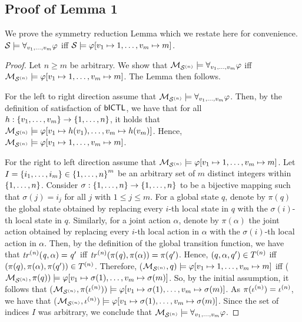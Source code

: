 \documentclass{article}
\newenvironment{customlemma}[1]
  {\renewcommand\theinnercustomlemma{#1}\innercustomlemma}
  {\endinnercustomlemma}
\begin{document}
\subsection{Proof of Lemma 1} 
We prove the symmetry reduction Lemma which we restate here for convenience.
\begin{customlemma}{1}
$\mathcal S \models \forall_{v_1,\ldots,v_m} \varphi$ iff $\mathcal S \models \varphi[v_1 \mapsto 1, \ldots, v_m
\mapsto m]$.
\end{customlemma}
\begin{proof}
Let  $n \geq m$ be arbitrary. We show that $\mathcal{M}_{\mathcal{S}^{(n)}}
\models \forall_{v_1,\ldots,v_m} \varphi$ iff $\mathcal{M}_{\mathcal{S}^{(n)}} \models \varphi[v_1 \mapsto 1, \ldots, v_m
\mapsto m]$. The Lemma then follows.

For the left to right direction assume that $\mathcal{M}_{\mathcal{S}^{(n)}} \models \forall_{v_1,\ldots,v_m} \varphi$. Then,
    by the definition of satisfaction of $\sf{bICTL}$, we have that for all $h:
    \left \{ v_1, \ldots, v_m \right \} \rightarrow \left \{ 1,\ldots,n \right \}$,  it holds that $\mathcal{M}_{\mathcal{S}^{(n)}} \models \varphi[v_1 \mapsto h(v_1), \ldots, v_m \mapsto h(v_m)]$.  Hence,
    $\mathcal{M}_{\mathcal{S}^{(n)}} \models \varphi[v_1 \mapsto 1, \ldots, v_m \mapsto m]$.

For the right to left direction assume that
    $\mathcal{M}_{\mathcal{S}^{(n)}} \models \varphi[v_1 \mapsto 1, \ldots, v_m \mapsto m]$. Let $I =
    \left \{ i_1, \ldots, i_m \right \} \in \left \{ 1, \ldots, n \right \}^m$ be an arbitrary set of $m$
    distinct integers within $\left \{ 1,\ldots,n \right \}$.  Consider $\sigma : \left \{ 1,
    \ldots, n \right \} \rightarrow \left \{ 1, \ldots, n \right \}$ to be a bijective mapping such
    that $\sigma(j) = i_j$ for all $j$ with $1 \leq j \leq m$. For a global
    state $q$, denote by $\pi(q)$ the global state obtained by replacing every
    $i$-th local state in $q$ with the $\sigma(i)$-th local state in $q$.
    Similarly, for a joint action $\alpha$, denote by $\pi(\alpha)$ the joint
    action obtained by replacing every $i$-th local action in $\alpha$ with the
    $\sigma(i)$-th local action in $\alpha$. Then, by the definition of the
    global transition function, we have that $\it{tr}^{(n)}(q, \alpha) = q'$  iff
    $\it{tr}^{(n)}(\pi(q), \pi(\alpha)) = \pi(q')$.  Hence,  $(q, \alpha, q') \in
    T^{(n)}$ iff $(\pi(q), \pi(\alpha), \pi(q')) \in T^{(n)}$.
    Therefore, ($\mathcal{M}_{\mathcal{S}^{(n)}}, q) \models  \varphi[v_1 \mapsto 1, \ldots, v_m
    \mapsto m]$ iff ($\mathcal{M}_{\mathcal{S}^{(n)}}, \pi(q)) \models  \varphi[v_1 \mapsto \sigma(1),
    \ldots, v_m \mapsto \sigma(m)]$. So, by the initial assumption,  it follows
    that ($\mathcal{M}_{\mathcal{S}^{(n)}}, \pi(\iota^{({n})})) \models  \varphi[v_1 \mapsto \sigma(1),
    \ldots, v_m \mapsto \sigma(m)]$. As $\pi(\iota^{({n})}) = \iota^{({n})}$, we
    have that ($\mathcal{M}_{\mathcal{S}^{(n)}}, \iota^{({n})}) \models  \varphi[v_1 \mapsto \sigma(1),
\ldots, v_m \mapsto \sigma(m)]$. Since the set of indices $I$ was arbitrary, we
conclude that $\mathcal{M}_{\mathcal{S}^{(n)}} \models \forall_{v_1,\ldots,v_m} \varphi$.  \end{proof}
\end{document}
